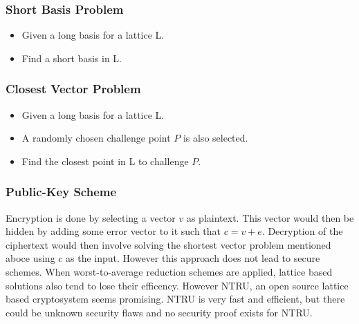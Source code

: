\documentclass[journal]{IEEEtran}
\begin{document}
\subsubsection{Short Basis Problem}
\begin{itemize}
  \item Given a long basis for a lattice L.
  \item Find a short basis in L.
\end{itemize}
\subsubsection{Closest Vector Problem}
\begin{itemize}
  \item Given a long basis for a lattice L.
  \item A randomly chosen challenge point $P$ is also selected.
  \item Find the closest point in L to challenge $P$.
\end{itemize}
\subsubsection{Public-Key Scheme}
Encryption is done by selecting a vector $v$ as plaintext. This vector would then be hidden by adding some error vector to it such that $c=v+e$.
Decryption of the ciphertext would then involve solving the shortest vector problem mentioned aboce using $c$ as the input. However this approach does not lead to secure schemes. When worst-to-average reduction schemes
are applied, lattice based solutions also tend to lose their efficency. However NTRU, an open source lattice based cryptosystem seems promising. NTRU is very fast and efficient, but there could be unknown security flaws and no security proof exists for NTRU.
\end{document}
